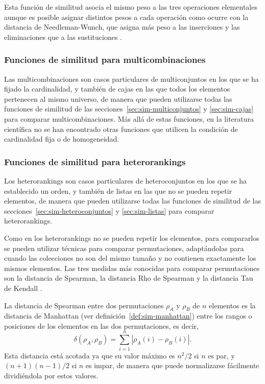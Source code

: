 \documentclass[a4paper,10pt,twoside]{article}
\theoremstyle{definition}
\begin{document}
Esta función de similitud asocia el mismo peso a las tres operaciones elementales aunque es posible asignar distintos pesos a cada operación como ocurre con la distancia de Needleman-Wunch, que asigna más peso a las
inserciones y las eliminaciones que a las sustituciones \cite{needleman1970general}.


\subsubsection{Funciones de similitud para multicombinaciones}
\label{sec:sim-multicombinaciones}
Las multicombinaciones son casos particulares de multiconjuntos en los que se ha fijado la cardinalidad, y también de cajas en las que todos los elementos pertenecen al mismo universo, de manera que pueden utilizarse todas las funciones de similitud de las secciones~\ref{sec:sim-multiconjuntos} y \ref{sec:sim-cajas} para comparar multicombinaciones.
Más allá de estas funciones, en la literatura científica no se han encontrado otras funciones que utilicen la condición de cardinalidad fija o de homogeneidad.


\subsubsection{Funciones de similitud para heterorankings}
\label{sec:sim-heterorankings}
Los heterorankings son casos particulares de heteroconjuntos en los que se ha establecido un orden, y también de listas en las que no se pueden repetir elementos, de manera que pueden utilizarse todas las funciones de similitud de las secciones~\ref{sec:sim-heteroconjuntos} y \ref{sec:sim-listas} para comparar heterorankings. 

Como en los heterorankings no se pueden repetir los elementos, para compararlos se pueden utilizar técnicas para comparar permutaciones, adaptándolas para cuando las colecciones no son del mismo tamaño y no contienen exactamente los mismos elementos.
Las tres medidas más conocidas para comparar permutaciones son la distancia de Spearman, la distancia Rho de Spearman y la distancia Tau de Kendall \cite{kendall1990correlation}.

La distancia de Spearman entre dos permutaciones $\rho_A$ y $\rho_B$ de $n$ elementos es la distancia de Manhattan (ver definición~\ref{def:sim-manhattan}) entre los rangos o posiciones de los elementos en las dos permutaciones, es decir,
\[
\delta(\rho_A,\rho_B)=\sum_{i=1}^n |\rho_A(i)-\rho_B(i)|.
\]
Esta distancia está acotada ya que su valor máximo es $n^2/2$ si $n$ es par, y $(n+1)(n-1)/2$ si $n$ es impar, de manera que puede normalizarse fácilmente dividiéndola por estos valores.
\end{document}
